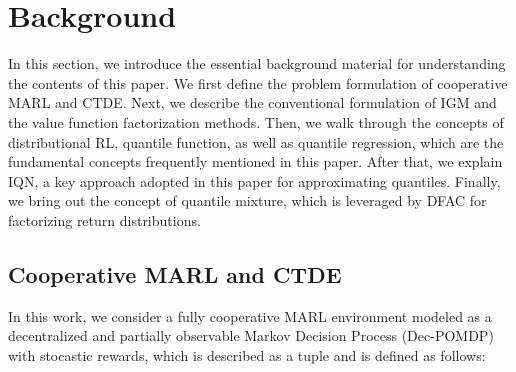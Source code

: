 \documentclass[twoside,11pt]{article}
\begin{document}
 \section{Background}
\label{sec:background}

In this section, we introduce the essential background material for understanding the contents of this paper. We first define the problem formulation of cooperative MARL and CTDE. Next, we describe the conventional formulation of IGM and the value function factorization methods. Then, we walk through the concepts of distributional RL, quantile function, as well as quantile regression, which are the fundamental concepts frequently mentioned in this paper. After that, we explain IQN, a key approach adopted in this paper for approximating quantiles.  Finally, we bring out the concept of quantile mixture, which is leveraged by DFAC for factorizing return distributions.


\subsection{Cooperative MARL and CTDE}
\label{subsec:background_cooperative_marl_and_ctde}

In this work, we consider a fully cooperative MARL environment modeled as a decentralized and partially observable Markov Decision Process (Dec-POMDP)~\citep{Oliehoek2016CTDE} with stocastic rewards, which is described as a tuple  and is defined as follows:
\end{document}
